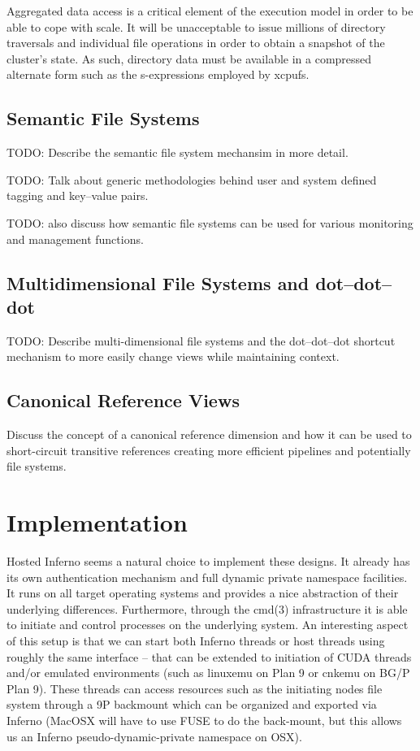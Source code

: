 \documentclass{sig-alternate}
\begin{document}
Aggregated data access is a critical element of the execution model in
order to be able to cope with scale.  It will be unacceptable to issue
millions of directory traversals and individual file operations in order 
to obtain a snapshot of the cluster's state.  As such, directory data must
be available in a compressed alternate form such as the s-expressions 
employed by xcpufs. 

\subsection*{Semantic File Systems}

TODO: Describe the semantic file system mechansim in more detail.

TODO: Talk about generic methodologies behind user and system defined 
tagging and key--value pairs.

TODO: also discuss how semantic file systems can be used for various
monitoring and management functions.

\subsection*{Multidimensional File Systems and dot--dot--dot}

TODO: Describe multi-dimensional file systems and the dot--dot--dot 
shortcut mechanism to more easily change views while maintaining context.

\subsection*{Canonical Reference Views}

Discuss the concept of a canonical reference dimension and how it can
be used to short-circuit transitive references creating more efficient
pipelines and potentially file systems.

\section{Implementation}

Hosted Inferno seems a natural choice to implement these designs.  It already
has its own authentication mechanism and full dynamic private namespace
facilities.  It runs on all target operating systems and provides a nice
abstraction of their underlying differences.  Furthermore, through the cmd(3) 
infrastructure it is able to initiate and control processes on the 
underlying system.  
An interesting aspect of this setup is that we can start both Inferno threads
or host threads using roughly the same interface -- that can be extended to
initiation of CUDA threads and/or emulated environments (such as linuxemu
on Plan 9 or cnkemu on BG/P Plan 9).
These threads can access resources such as the 
initiating nodes file system through a 9P backmount which can be organized
and exported via Inferno (MacOSX will have to use FUSE to do the back-mount,
but this allows us an Inferno pseudo-dynamic-private namespace on OSX).
\end{document}
